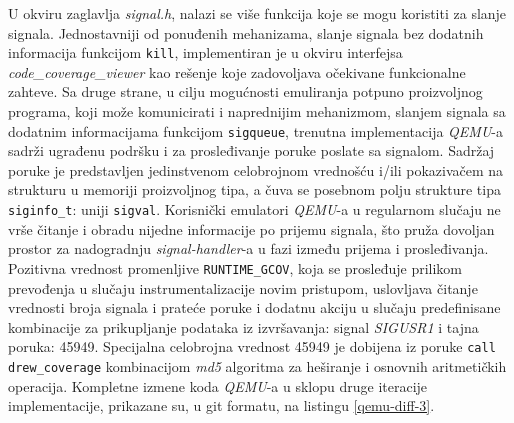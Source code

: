 \documentclass[12pt,oneside]{memoir}
\newcommand{\kod}[1]{\texttt{#1}}
\newcommand{\strano}[1]{\textit{#1}}
\begin{document}
U okviru zaglavlja \strano{signal.h}, nalazi se više funkcija koje se mogu koristiti za slanje signala. Jednostavniji od ponuđenih mehanizama, slanje signala bez dodatnih informacija funkcijom \kod{kill}, implementiran je u okviru interfejsa \strano{code\_coverage\_viewer} kao rešenje koje zadovoljava očekivane funkcionalne zahteve. Sa druge strane, u cilju mogućnosti emuliranja potpuno proizvoljnog programa, koji može komunicirati i naprednijim mehanizmom, slanjem signala sa dodatnim informacijama funkcijom \kod{sigqueue}, trenutna implementacija \strano{QEMU}-a sadrži ugrađenu podršku i za prosleđivanje poruke poslate sa signalom. Sadržaj poruke je predstavljen jedinstvenom celobrojnom vrednošću i/ili pokazivačem na strukturu u memoriji proizvoljnog tipa, a čuva se posebnom polju strukture tipa \kod{siginfo\_t}: uniji \kod{sigval}. Korisnički emulatori \strano{QEMU}-a u regularnom slučaju ne vrše čitanje i obradu nijedne informacije po prijemu signala, što pruža dovoljan prostor za nadogradnju \strano{signal-handler}-a u fazi između prijema i prosleđivanja. Pozitivna vrednost promenljive \kod{RUNTIME\_GCOV}, koja se prosleđuje prilikom prevođenja u slučaju instrumentalizacije novim pristupom, uslovljava čitanje vrednosti broja signala i prateće poruke i dodatnu akciju u slučaju predefinisane kombinacije za prikupljanje podataka iz izvršavanja: signal \strano{SIGUSR1} i tajna poruka: 45949. Specijalna celobrojna vrednost 45949 je dobijena iz poruke \kod{call drew\_coverage} kombinacijom \strano{md5} algoritma za heširanje i osnovnih aritmetičkih operacija. Kompletne izmene koda \strano{QEMU}-a u sklopu druge iteracije implementacije, prikazane su, u git formatu, na listingu \ref{qemu-diff-3}.

\newpage
\end{document}
